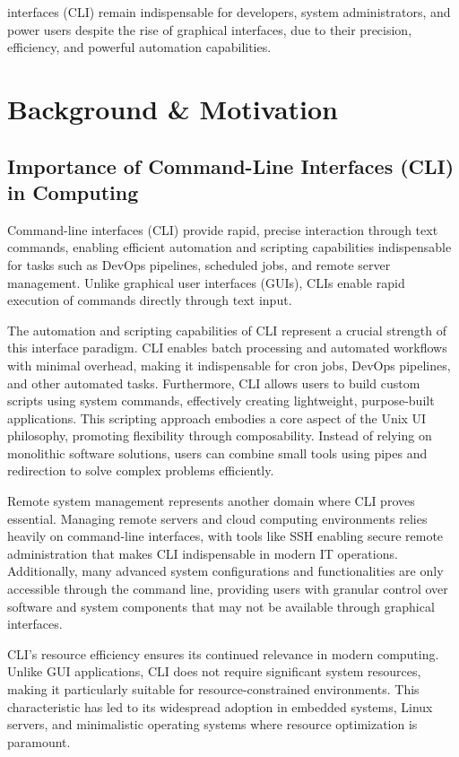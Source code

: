  interfaces (CLI) remain indispensable for developers, system administrators, and power users despite the rise of graphical interfaces, due to their precision, efficiency, and powerful automation capabilities.

\section{Background \& Motivation}

\subsection{Importance of Command-Line Interfaces (CLI) in Computing}

Command-line interfaces (CLI) provide rapid, precise interaction through text commands, enabling efficient automation and scripting capabilities indispensable for tasks such as DevOps pipelines, scheduled jobs, and remote server management. Unlike graphical user interfaces (GUIs), CLIs enable rapid execution of commands directly through text input.

The automation and scripting capabilities of CLI represent a crucial strength of this interface paradigm. CLI enables batch processing and automated workflows with minimal overhead, making it indispensable for cron jobs, DevOps pipelines, and other automated tasks. Furthermore, CLI allows users to build custom scripts using system commands, effectively creating lightweight, purpose-built applications. This scripting approach embodies a core aspect of the Unix UI philosophy, promoting flexibility through composability. Instead of relying on monolithic software solutions, users can combine small tools using pipes and redirection to solve complex problems efficiently.

Remote system management represents another domain where CLI proves essential. Managing remote servers and cloud computing environments relies heavily on command-line interfaces, with tools like SSH enabling secure remote administration that makes CLI indispensable in modern IT operations. Additionally, many advanced system configurations and functionalities are only accessible through the command line, providing users with granular control over software and system components that may not be available through graphical interfaces.

CLI's resource efficiency ensures its continued relevance in modern computing. Unlike GUI applications, CLI does not require significant system resources, making it particularly suitable for resource-constrained environments. This characteristic has led to its widespread adoption in embedded systems, Linux servers, and minimalistic operating systems where resource optimization is paramount.

